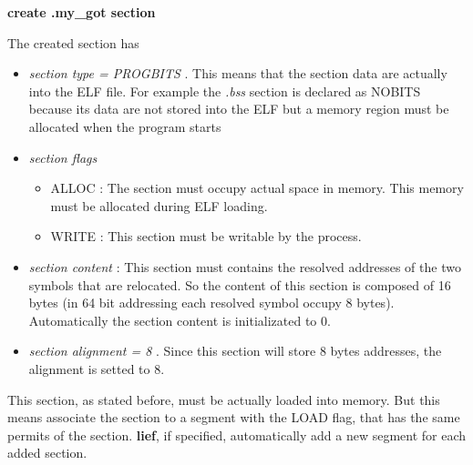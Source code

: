 \begin{center}
\textbf{create .my\_got section}    
\end{center}
The created section has 
\begin{itemize}
    \item \textit{section type = PROGBITS} . This means that the section data are actually into the \gls{ELF} file.
        For example the \textit{.bss} section is declared as NOBITS because its data are not stored into the \gls{ELF} but a 
        memory region must be allocated when the program starts
    \item \textit{section flags} \begin{itemize}
        \item ALLOC : The section must occupy actual space in memory. This memory must be allocated during \gls{ELF} loading.
        \item WRITE : This section must be writable by the process.
    \end{itemize}
    \item \textit{section content} : This section must contains the resolved addresses of the two symbols that are relocated.
        So the content of this section is composed of 16 bytes (in 64 bit addressing each resolved symbol occupy 8 bytes).
        Automatically the section content is initializated to 0.
    \item \textit{section alignment = 8} . Since this section will store 8 bytes addresses, the alignment is setted to 8.
\end{itemize}
This section, as stated before, must be actually loaded into memory. But this means associate the section to a segment 
with the LOAD flag, that has the same permits of the section.
\textbf{lief}, if specified, automatically add a new segment for each added section.

